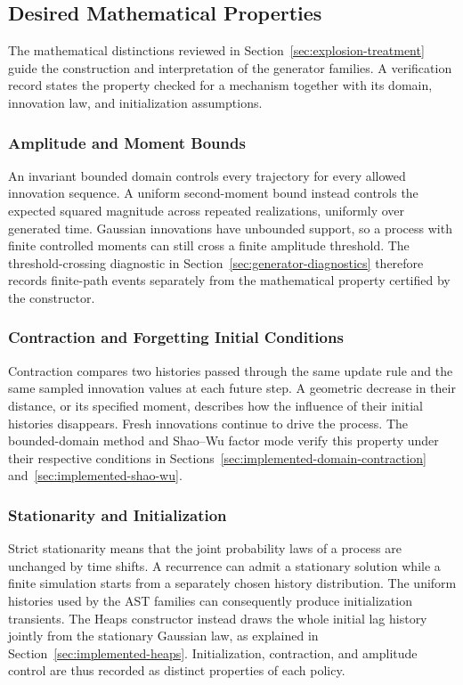 \subsection{Desired Mathematical Properties}
\label{sec:generator-properties}

The mathematical distinctions reviewed in
Section~\ref{sec:explosion-treatment} guide the construction and interpretation
of the generator families. A verification record states the property checked
for a mechanism together with its domain, innovation law, and initialization
assumptions.

\subsubsection{Amplitude and Moment Bounds}
An invariant bounded domain controls every trajectory for every allowed
innovation sequence. A uniform second-moment bound instead controls the
expected squared magnitude across repeated realizations, uniformly over
generated time. Gaussian innovations have unbounded support, so a process
with finite controlled moments can still cross a finite amplitude threshold.
The threshold-crossing diagnostic in Section~\ref{sec:generator-diagnostics}
therefore records finite-path events separately from the mathematical
property certified by the constructor.

\subsubsection{Contraction and Forgetting Initial Conditions}
Contraction compares two histories passed through the same update rule and
the same sampled innovation values at each future step. A geometric decrease
in their distance, or its specified moment, describes how the influence of
their initial histories disappears. Fresh innovations continue to drive the
process. The bounded-domain method and Shao--Wu factor mode verify this
property under their respective conditions in
Sections~\ref{sec:implemented-domain-contraction}
and~\ref{sec:implemented-shao-wu}.

\subsubsection{Stationarity and Initialization}
Strict stationarity means that the joint probability laws of a process are
unchanged by time shifts. A recurrence can admit a stationary solution while
a finite simulation starts from a separately chosen history distribution.
The uniform histories used by the AST families can consequently produce
initialization transients. The Heaps constructor instead draws the whole
initial lag history jointly from the stationary Gaussian law, as explained
in Section~\ref{sec:implemented-heaps}. Initialization, contraction, and
amplitude control are thus recorded as distinct properties of each policy.
